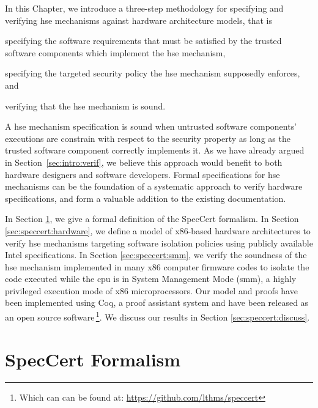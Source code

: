 \newpage

In this Chapter, we introduce a three-step methodology for specifying and
verifying \ac{hse} mechanisms against hardware architecture models, that is
%
\begin{inparaenum}[(1)]
\item specifying the software requirements that must be satisfied by the trusted
  software components which implement the \ac{hse} mechanism,
%
\item specifying the targeted security policy the \ac{hse} mechanism supposedly
  enforces, and
%
\item verifying that the \ac{hse} mechanism is sound.
\end{inparaenum}
%
A \ac{hse} mechanism specification is sound when untrusted software components'
executions are constrain with respect to the security property as long as the
trusted software component correctly implements it.
%
As we have already argued in Section~\ref{sec:intro:verif}, we believe this
approach would benefit to both hardware designers and software developers.
%
Formal specifications for \ac{hse} mechanisms can be the foundation of a
systematic approach to verify hardware specifications, and form a valuable
addition to the existing documentation.

In Section \ref{sec:speccert:framework}, we give a formal definition of the
SpecCert formalism.
%
In Section \ref{sec:speccert:hardware}, we define a model of x86-based hardware
architectures to verify \ac{hse} mechanisms targeting software isolation
policies using publicly available Intel specifications.
%
In Section \ref{sec:speccert:smm}, we verify the soundness of the \ac{hse}
mechanism implemented in many x86 computer firmware codes to isolate the code
executed while the \ac{cpu} is in System Management Mode (\ac{smm}), a highly
privileged execution mode of x86 microprocessors.
%
Our model and proofs have been implemented using Coq, a proof assistant system
and have been released as an open source software\,\footnote{Which can can be
  found at: \url{https://github.com/lthms/speccert}}.
%
We discuss our results in Section \ref{sec:speccert:discuss}.

\section{SpecCert Formalism} \label{sec:speccert:framework}

